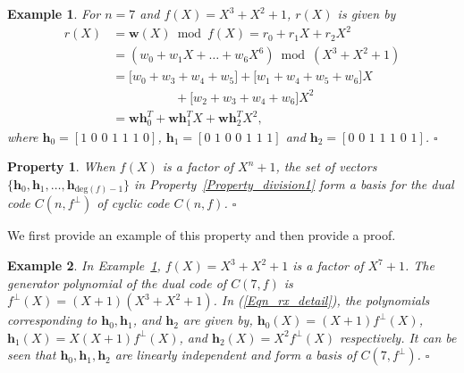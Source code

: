 \documentclass[10pt,journal]{IEEEtran}
\newtheorem{example}{Example}
\newtheorem{property}{Property}
\def \deg{{\mathrm{deg}}}
\begin{document}
\begin{example}
% 
\label{Example_propertyE1}
% 
For $n=7$ and $f(X) = X^3+X^2+1$, $r(X)$ is given by
% 
% 
\begin{align}
%  
r(X) &= \mathbf{w}(X) \bmod f(X) = r_0 + r_1X +r_2X^2 \nonumber \\
     & =(w_0 + w_1 X + \ldots + w_6 X^6) \bmod (X^3+X^2+1) \nonumber \\
     &= \Big[w_0 + w_3 + w_4 + w_5\Big] + \Big[w_1 + w_4 + w_5 + w_6\Big]X \nonumber \\
     &\mbox{~~~~~~~~~~~~~~~} + \Big[w_2 + w_3 + w_4 + w_6\Big]X^2 \nonumber \\
     & = \mathbf{w}\mathbf{h}_0^T + \mathbf{w}\mathbf{h}_1^T X + \mathbf{w}\mathbf{h}_2^T X^2,
% 
\label{Eqn_rx_detail}
% 
\end{align}
% 
where $\mathbf{h}_0 = [1 \mbox{~} 0 \mbox{~} 0 \mbox{~}1 \mbox{~}1 \mbox{~}1 \mbox{~}0]$, 
$\mathbf{h}_1 = [0 \mbox{~} 1 \mbox{~} 0 \mbox{~} 0 \mbox{~} 1 \mbox{~} 1 \mbox{~} 1 ]$ and
$\mathbf{h}_2 = [0 \mbox{~} 0 \mbox{~} 1 \mbox{~} 1 \mbox{~} 1 \mbox{~} 0 \mbox{~}1 ]$.
% 
% 
% 
\hfill $\square$
% 
\end{example}

% 

\begin{property}
\label{Property_division2}
% 
When $f(X)$ is a factor of $X^n+1$, the set of vectors $\{ \mathbf{h}_0, \mathbf{h}_1, \ldots, \mathbf{h}_{\deg(f)-1} \}$ in 
Property~\ref{Property_division1} form a basis for the dual code $C(n,f^{\perp})$
of cyclic code $C(n,f)$.
% 
\hfill $\square$
% 
\end{property}
% 
We first provide an example of this property and then provide a proof.
% 
\begin{example}
%  
In Example~\ref{Example_propertyE1}, $f(X)=X^3+X^2+1$ is a factor of $X^7+1$.
The generator polynomial of the dual code of $C(7,f)$ is $f^{\perp}(X) = (X+1)(X^3+X^2+1)$.
In (\ref{Eqn_rx_detail}), the polynomials corresponding to $\mathbf{h}_0,\mathbf{h}_1$, and $\mathbf{h}_2$ are given by, 
$\mathbf{h}_0(X) = (X+1)f^{\perp}(X)$, $\mathbf{h}_1(X) = X(X+1)f^{\perp}(X)$, and $\mathbf{h}_2(X) = X^2f^{\perp}(X)$ respectively.
It can be seen that $\mathbf{h}_0,\mathbf{h}_1,\mathbf{h}_2$ are linearly independent and form a basis of $C(7,f^{\perp})$.
% 
\hfill $\square$
% 
\end{example}
% 
\end{document}
